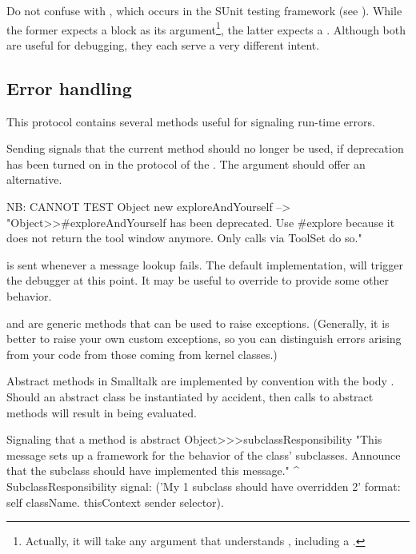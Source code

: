 \documentclass[a4paper,10pt,twoside]{book}
\begin{document}
Do not confuse  with , which occurs in the SUnit testing framework (see ).
While the former expects a block as its argument\footnote{Actually, it will take any argument that understands , including a .}, the latter expects a .
Although both are useful for debugging, they each serve a very different intent.

\subsection{Error handling}

This protocol contains several methods useful for signaling run-time errors.

Sending  signals that the current method should no longer be used, if deprecation has been turned on in the  protocol of the .
The  argument should offer an alternative.

\begin{code}{NB: CANNOT TEST}
Object new exploreAndYourself --> "Object>>#exploreAndYourself has been deprecated. Use #explore because it does not return the tool window anymore. Only calls via ToolSet do so."
\end{code}

 is sent whenever a message lookup fails.
The default implementation, \ie {} will trigger the debugger at this point.
It may be useful to override  to provide some other behavior.


 and  are generic methods that can be used to raise exceptions.
(Generally, it is better to raise your own custom exceptions, so you can distinguish errors arising from your code from those coming from kernel classes.)

Abstract methods in Smalltalk are implemented by convention with the body .
Should an abstract class be instantiated by accident, then calls to abstract methods will result in  being evaluated.

\begin{method}{Signaling that a method is abstract}
Object>>>subclassResponsibility
    "This message sets up a framework for the behavior of the class' subclasses.
    Announce that the subclass should have implemented this message."
    ^ SubclassResponsibility
        signal: ('My {1} subclass should have overridden {2}'
            format: {self className. thisContext sender selector}).
\end{method}
\end{document}
